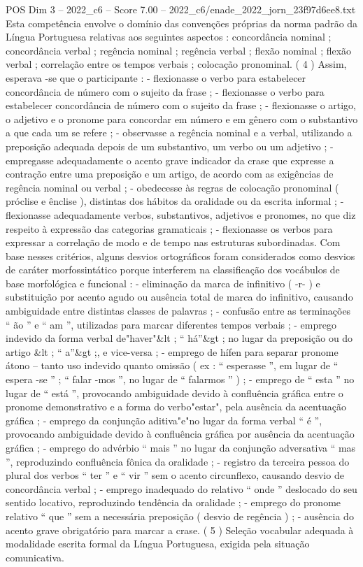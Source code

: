 \begin{textsample}{POS Dim 3 – 2022\_c6 – Score 7.00 – 2022\_c6/enade\_2022\_jorn\_23f97d6ee8.txt}
Esta competência envolve o domínio das convenções próprias da norma padrão da Língua Portuguesa relativas aos seguintes aspectos : concordância nominal ; concordância verbal ; regência nominal ; regência verbal ; flexão nominal ; flexão verbal ; correlação entre os tempos verbais ; colocação pronominal. ( 4 ) Assim, esperava -se que o participante : - flexionasse o verbo para estabelecer concordância de número com o sujeito da frase ; - flexionasse o verbo para estabelecer concordância de número com o sujeito da frase ; - flexionasse o artigo, o adjetivo e o pronome para concordar em número e em gênero com o substantivo a que cada um se refere ; - observasse a regência nominal e a verbal, utilizando a preposição adequada depois de um substantivo, um verbo ou um adjetivo ; - empregasse adequadamente o acento grave indicador da crase que expresse a contração entre uma preposição e um artigo, de acordo com as exigências de regência nominal ou verbal ; - obedecesse às regras de colocação pronominal ( próclise e ênclise ), distintas dos hábitos da oralidade ou da escrita informal ; - flexionasse adequadamente verbos, substantivos, adjetivos e pronomes, no que diz respeito à expressão das categorias gramaticais ; - flexionasse os verbos para expressar a correlação de modo e de tempo nas estruturas subordinadas.
Com base nesses critérios, alguns desvios ortográficos foram considerados como desvios de caráter morfossintático porque interferem na classificação dos vocábulos de base morfológica e funcional : - eliminação da marca de infinitivo ( -r- ) e substituição por acento agudo ou ausência total de marca do infinitivo, causando ambiguidade entre distintas classes de palavras ; - confusão entre as terminações “ ão ” e “ am ”, utilizadas para marcar diferentes tempos verbais ; - emprego indevido da forma verbal de"haver"\&lt ; “ há”\&gt ; no lugar da preposição ou do artigo \&lt ; “ a”\&gt ;, e vice-versa ; - emprego de hífen para separar pronome átono – tanto uso indevido quanto omissão ( ex : “ esperasse ”, em lugar de “ espera -se ” ; “ falar -mos ”, no lugar de “ falarmos ” ) ; - emprego de “ esta ” no lugar de “ está ”, provocando ambiguidade devido à confluência gráfica entre o pronome demonstrativo e a forma do verbo"estar", pela ausência da acentuação gráfica ; - emprego da conjunção aditiva"e"no lugar da forma verbal “ é ”, provocando ambiguidade devido à confluência gráfica por ausência da acentuação gráfica ; - emprego do advérbio “ mais ” no lugar da conjunção adversativa “ mas ”, reproduzindo confluência fônica da oralidade ; - registro da terceira pessoa do plural dos verbos “ ter ” e “ vir ” sem o acento circunflexo, causando desvio de concordância verbal ; - emprego inadequado do relativo “ onde ” deslocado do seu sentido locativo, reproduzindo tendência da oralidade ; - emprego do pronome relativo “ que ” sem a necessária preposição ( desvio de regência ) ; - ausência do acento grave obrigatório para marcar a crase. ( 5 ) Seleção vocabular adequada à modalidade escrita formal da Língua Portuguesa, exigida pela situação comunicativa.

\end{textsample}
